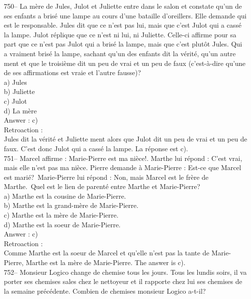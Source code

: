 ﻿\documentclass[letterpaper, 12pt]{article}
\begin{document}
750-- La m\`ere de Jules, Julot et Juliette entre dans le salon et constate
qu'un de ses enfants a bris\'e une lampe au cours d'une bataille
d'oreillers.  Elle demande qui est le responsable. Jules dit que ce n'est
pas lui, mais que c'est Julot qui a cass\'e la lampe.  Julot r\'eplique que
ce n'est ni lui, ni Juliette.  Celle-ci affirme pour sa part que ce n'est
pas Julot qui a bris\'e la lampe, mais que c'est plut\^ot Jules.  Qui a
vraiment bris\'e la lampe, sachant qu'un des enfants dit la v\'erit\'e,
qu'un autre ment et que le troisi\`eme dit un peu de vrai et un peu de faux
(c'est-\`a-dire qu'une de ses affirmations est vraie et l'autre fausse)?\\
a) Jules\\
b) Juliette\\
c) Julot\\
d) La m\`ere\\

Answer : c)\\

Retroaction : \\
Jules dit la v\'erit\'e et Juliette ment alors que Julot dit un peu de vrai
et un peu de faux.  C'est donc Julot qui a cass\'e la lampe. La r\'eponse
est c).\\

751-- Marcel affirme : \og Marie-Pierre est ma ni\`ece!\fg .  Marthe
lui r\'epond : \og C'est vrai, mais elle n'est pas ma ni\`ece\fg .
Pierre demande \`a Marie-Pierre : \og Est-ce que Marcel est
mari\'e?\fg\ Marie-Pierre lui r\'epond : \og Non, mais Marcel est le
fr\`ere de Marthe.\fg\  Quel est le lien de parent\'e
entre Marthe et Marie-Pierre?\\
a) Marthe est la cousine de Marie-Pierre.\\
b) Marthe est la grand-m\`ere de Marie-Pierre.\\
c) Marthe est la m\`ere de Marie-Pierre.\\
d) Marthe est la soeur de Marie-Pierre.\\

Answer : c)\\

Retroaction : \\
Comme Marthe est la soeur de Marcel et qu'elle n'est pas la tante de
Marie-Pierre, Marthe est la m\`ere de Marie-Pierre.  The answer is c).\\

752-- Monsieur Logico change de chemise tous les jours.  Tous les lundis
soirs, il va porter ses chemises sales chez le nettoyeur et il rapporte chez
lui ses chemises de la semaine pr\'ec\'edente.  Combien de chemises monsieur
Logico a-t-il?\\
\end{document}
